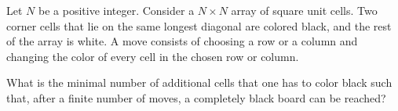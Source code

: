 Let $N$ be a positive integer. Consider a $N \times N$ array of square unit cells. Two corner cells that lie on the same longest diagonal are colored black, and the rest of the array is white. A move consists of choosing a row or a column and changing the color of every cell in the chosen row or column.

What is the minimal number of additional cells that one has to color black such that, after a finite number of moves, a completely black board can be reached?